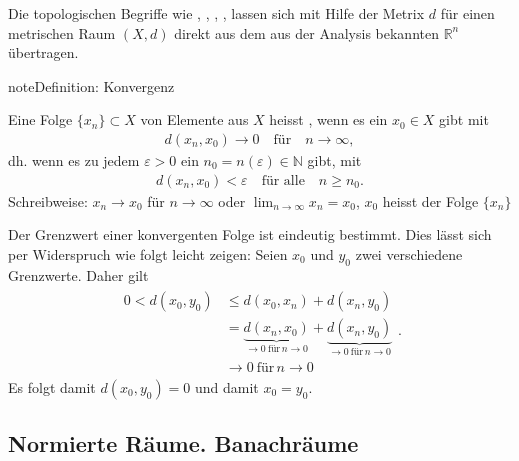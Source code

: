 \documentclass[letterpaper,10pt,english]{jupyterBook}
\begin{document}
Die topologischen Begriffe wie , , , ,  lassen sich mit Hilfe der Metrix \(d\) für einen metrischen Raum \((X,d)\) direkt aus dem aus der Analysis bekannten \(\mathbb{R}^n\) übertragen.

\begin{sphinxadmonition}{note}{Definition: Konvergenz}

Eine Folge \(\{x_n\}\subset X\) von Elemente aus \(X\) heisst , wenn es ein \(x_0\in X\) gibt mit
\begin{equation*}
\begin{split}d(x_n,x_0) \to 0\quad \text{für}\quad n\to\infty,\end{split}
\end{equation*}
dh. wenn es zu jedem \(\varepsilon > 0\) ein \(n_0 = n(\varepsilon)\in\mathbb{N}\) gibt, mit
\begin{equation*}
\begin{split}d(x_n,x_0) < \varepsilon\quad\text{für alle}\quad n\ge n_0.\end{split}
\end{equation*}
Schreibweise: \(x_n \to x_0\) für \(n \to \infty\) oder \(\lim_{n\to\infty} x_n = x_0\), \(x_0\) heisst  der Folge \(\{x_n\}\)
\end{sphinxadmonition}

Der Grenzwert einer konvergenten Folge ist eindeutig bestimmt. Dies lässt sich per Widerspruch wie folgt leicht zeigen: Seien \(x_0\) und \(y_0\) zwei verschiedene Grenzwerte. Daher gilt
\begin{equation*}
\begin{split}\begin{split}
0 < d(x_0,y_0) & \le d(x_0, x_n) + d(x_n,y_0)\\
& = \underbrace{d(x_n,x_0)}_{\to 0\ \text{für}\, n\to 0} + \underbrace{d(x_n,y_0)}_{\to 0\ \text{für}\, n\to 0}\\
& \to 0\ \text{für}\, n\to 0\end{split}.\end{split}
\end{equation*}
Es folgt damit \(d(x_0,y_0)=0\) und damit \(x_0 = y_0\).


\subsection{Normierte Räume. Banachräume}
\label{\detokenize{Funktionalanalysis/Funktionalanalysis:normierte-raume-banachraume}}
\end{document}
